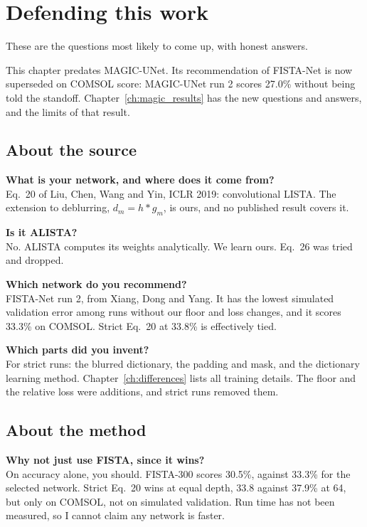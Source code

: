 \chapter{Defending this work}\label{ch:defence}

These are the questions most likely to come up, with honest answers.

\begin{careful}
This chapter predates MAGIC-UNet. Its recommendation of FISTA-Net is now superseded on COMSOL score: MAGIC-UNet run 2
scores 27.0\% without being told the standoff. Chapter~\ref{ch:magic_results} has the new questions and answers, and the
limits of that result.
\end{careful}

\section{About the source}

\textbf{What is your network, and where does it come from?}\\
Eq.~20 of Liu, Chen, Wang and Yin, ICLR 2019: convolutional LISTA. The extension to deblurring,
$d_m=h*g_m$, is ours, and no published result covers it.

\textbf{Is it ALISTA?}\\
No. ALISTA computes its weights analytically. We learn ours. Eq.~26 was tried and dropped.

\textbf{Which network do you recommend?}\\
FISTA-Net run 2, from Xiang, Dong and Yang. It has the lowest simulated validation error among runs without our floor and loss
changes, and it scores 33.3\% on COMSOL. Strict Eq.~20 at 33.8\% is effectively tied.

\textbf{Which parts did you invent?}\\
For strict runs: the blurred dictionary, the padding and mask, and the dictionary learning method. Chapter~\ref{ch:differences}
lists all training details. The floor and the relative loss were additions, and strict runs removed them.

\section{About the method}

\textbf{Why not just use FISTA, since it wins?}\\
On accuracy alone, you should. FISTA-300 scores 30.5\%, against 33.3\% for the selected network. Strict Eq.~20 wins at equal
depth, 33.8 against 37.9\% at 64, but only on COMSOL, not on simulated validation. Run time has not been measured, so I
cannot claim any network is faster.

